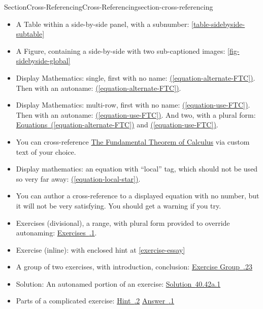 \documentclass[twoside,10pt,]{article}
\newcommand{\xreffont}{\relax}
\numberwithin{equation}{section}
\begin{document}
\begin{sectionptx}{Section}{Cross-Referencing}{}{Cross-Referencing}{}{}{section-cross-referencing}
\begin{itemize}[label=\textbullet]
\item{}A Table within a side-by-side panel, with a subnumber: \hyperref[table-sidebyside-subtable]{{\xreffont\ref{table-sidebyside-subtable}}}%
\item{}A Figure, containing a side-by-side with two sub-captioned images: \hyperref[fig-sidebyside-global]{{\xreffont\ref{fig-sidebyside-global}}}%
\item{}Display Mathematics: single, first with no name: \hyperref[equation-alternate-FTC]{({\xreffont\ref{equation-alternate-FTC}})}.  Then with an autoname: \hyperref[equation-alternate-FTC]{({\xreffont\ref{equation-alternate-FTC}})}.%
\item{}Display Mathematics: multi-row, first with no name: \hyperref[equation-use-FTC]{({\xreffont\ref{equation-use-FTC}})}.  Then with an autoname: \hyperref[equation-use-FTC]{({\xreffont\ref{equation-use-FTC}})}.  And two, with a plural form: \hyperref[equation-alternate-FTC]{Equations~({\xreffont\ref{equation-alternate-FTC}})} and \hyperref[equation-use-FTC]{({\xreffont\ref{equation-use-FTC}})}.%
\item{}You can cross-reference \hyperref[equation-use-FTC]{The Fundamental Theorem of Calculus} via custom text of your choice.%
\item{}Display mathematics: an equation with  ``local'' tag, which should not be used so very far away: \hyperref[equation-local-star]{({\xreffont\ref{equation-local-star}})}.%
\item{}You can author a cross-reference to a displayed equation with no number, but it will not be very satisfying.  You should get a warning if you try.%
\item{}Exercises (divisional), a range, with plural form provided to override autonaming: \hyperlink{exercises-null-problem}{Exercises~{\xreffont 11.2.1}\textendash{}{\xreffont 11.2.3}}.%
\item{}Exercise (inline): with enclosed hint at \hyperref[exercise-essay]{{\xreffont\ref{exercise-essay}}}%
\item{}A group of two exercises, with introduction, conclusion: \hyperlink{exercisegroup-two-problems}{Exercise Group~{\xreffont 11.2.2\textendash{}3}}%
\item{}Solution: An autonamed portion of an exercise: \hyperlink{solution-antiderivative}{Solution~{\xreffont 40.42a.1}}%
\item{}Parts of a complicated exercise: \hyperlink{exercise-complicated-second-hint}{Hint~{\xreffont 40.12.2}} \hyperlink{exercise-complicated-first-answer}{Answer~{\xreffont 40.12.1}}%

\end{itemize}
\end{sectionptx}
\end{document}
